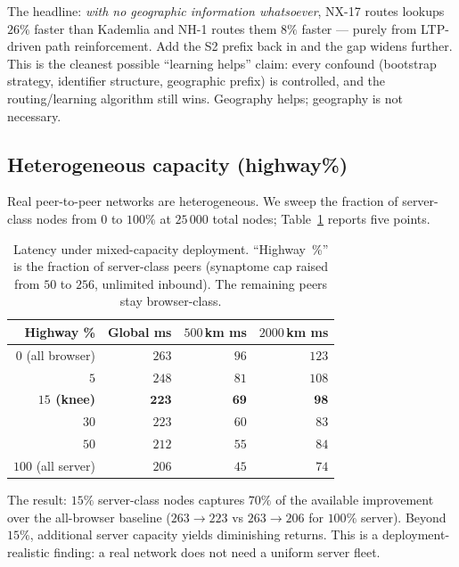 \documentclass[conference]{IEEEtran}
\newcommand{\nhone}{NH-1\xspace}
\newcommand{\NXseventeen}{NX-17\xspace}
\begin{document}
The headline: \emph{with no geographic information whatsoever},
\NXseventeen routes lookups $26\%$ faster than Kademlia and \nhone
routes them $8\%$ faster --- purely from LTP-driven path reinforcement.
Add the S2 prefix back in and the gap widens further. This is the
cleanest possible ``learning helps'' claim: every confound (bootstrap
strategy, identifier structure, geographic prefix) is controlled, and
the routing/learning algorithm still wins. Geography helps; geography
is not necessary.

\subsection{Heterogeneous capacity (highway\%)}
\label{sec:eval-highway}

Real peer-to-peer networks are heterogeneous. We sweep the fraction of
server-class nodes from $0$ to $100\%$ at $25\,000$ total nodes;
Table~\ref{tab:highway} reports five points.

\begin{table}[t]
\centering
\caption{Latency under mixed-capacity deployment. ``Highway~\%'' is the
fraction of server-class peers (synaptome cap raised from $50$ to $256$,
unlimited inbound). The remaining peers stay browser-class.}
\label{tab:highway}
\small
\setlength{\tabcolsep}{6pt}
\begin{tabular}{@{}rrrr@{}}
\toprule
\textbf{Highway \%} & \textbf{Global ms} & \textbf{$500$\,km ms} & \textbf{$2000$\,km ms} \\
\midrule
$0$ (all browser) & $263$ & $96$ & $123$ \\
$5$ & $248$ & $81$ & $108$ \\
\textbf{$15$ (knee)} & $\mathbf{223}$ & $\mathbf{69}$ & $\mathbf{98}$ \\
$30$ & $223$ & $60$ & $83$ \\
$50$ & $212$ & $55$ & $84$ \\
$100$ (all server) & $206$ & $45$ & $74$ \\
\bottomrule
\end{tabular}
\end{table}

The result: $15\%$ server-class nodes captures $70\%$ of the
available improvement over the all-browser baseline ($263 \to 223$ vs
$263 \to 206$ for $100\%$ server). Beyond $15\%$, additional server
capacity yields diminishing returns. This is a deployment-realistic
finding: a real network does not need a uniform server fleet.
\end{document}
